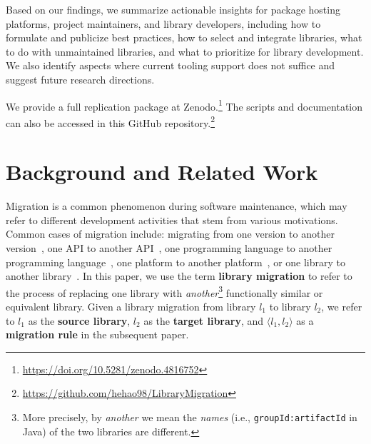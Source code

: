 \documentclass[sigconf, screen]{acmart}
\begin{document}
Based on our findings, we summarize actionable insights for package hosting platforms, project maintainers, and library developers, including how to formulate and publicize best practices, how to select and integrate libraries, what to do with unmaintained libraries, and what to prioritize for library development.
We also identify aspects where current tooling support does not suffice and suggest future research directions. 

We provide a full replication package at Zenodo.\footnote{ \url{https://doi.org/10.5281/zenodo.4816752}} 
The scripts and documentation can also be accessed in this GitHub repository.\footnote{\url{https://github.com/hehao98/LibraryMigration}}

\section{Background and Related Work}
\label{sec:background}

Migration is a common phenomenon during software maintenance, which may refer to different development activities that stem from various motivations.
Common cases of migration include: migrating from one version to another version~\cite{cossette2012seeking, kula2018developers}, one API to another API~\cite{alrubaye2019use, lamothe2020a3}, one programming language to another programming language~\cite{zhong2010mining, nguyen2013lexical}, one platform to another platform~\cite{fleurey2007model, verhaeghe2019gui}, or one library to another library~\cite{teyton2012mining, teyton2014study, kabinna2016logging, he2021multi}.
In this paper, we use the term \textbf{library migration} to refer to the process of replacing one library with \textit{another}\footnote{More precisely, by \textit{another} we mean the \textit{names} (i.e., \texttt{groupId:artifactId} in Java) of the two libraries are different.} functionally similar or equivalent library. 
Given a library migration from library $l_1$ to library $l_2$, we refer to $l_1$ as the \textbf{source library}, $l_2$ as the \textbf{target library}, and $\langle l_1, l_2 \rangle$ as a \textbf{migration rule} in the subsequent paper.
\end{document}
